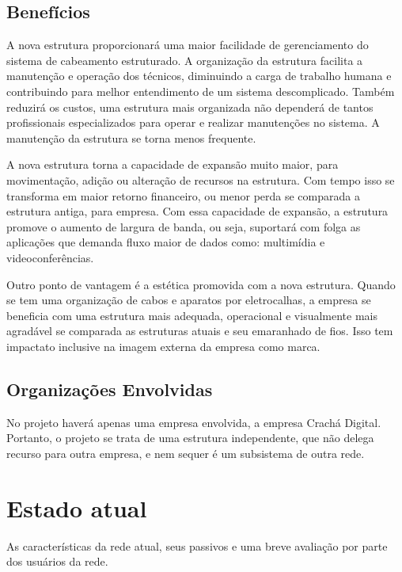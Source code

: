 \documentclass[	DIV=calc,%
							paper=a4,%
							fontsize=12pt,%
							onecolumn]{scrartcl}	 					%
\begin{document}
\subsection{Benefícios}

A nova estrutura proporcionará uma maior facilidade de gerenciamento do sistema de cabeamento estruturado. A organização da estrutura facilita a manutenção e operação dos técnicos, diminuindo a carga de trabalho humana e contribuindo para melhor entendimento de um sistema descomplicado.
Também reduzirá os custos, uma estrutura mais organizada não dependerá de tantos profissionais especializados para operar e realizar manutenções no sistema. A manutenção da estrutura se torna menos frequente.
 
A nova estrutura torna a capacidade de expansão muito maior, para movimentação, adição ou alteração de recursos na estrutura. Com tempo isso se transforma em maior retorno financeiro, ou menor perda se comparada a estrutura antiga, para empresa. Com essa capacidade de expansão, a estrutura promove o aumento de largura de banda, ou seja, suportará com folga as aplicações que demanda fluxo maior de dados como: multimídia e videoconferências.

Outro ponto de vantagem é a estética promovida com a nova estrutura. Quando se tem uma organização de cabos e aparatos por eletrocalhas, a empresa se beneficia com uma estrutura mais adequada, operacional e visualmente mais agradável se comparada as estruturas atuais e seu emaranhado de fios. Isso tem impactato inclusive na imagem externa da empresa como marca.

\subsection{Organizações Envolvidas}
No projeto haverá apenas uma empresa envolvida, a empresa Crachá Digital. Portanto, o projeto se trata de uma estrutura independente, que não delega recurso para outra empresa, e nem sequer é um subsistema de outra rede.



\section{Estado atual}
As características da rede atual, seus passivos e uma breve avaliação por parte dos usuários da rede.
\end{document}
